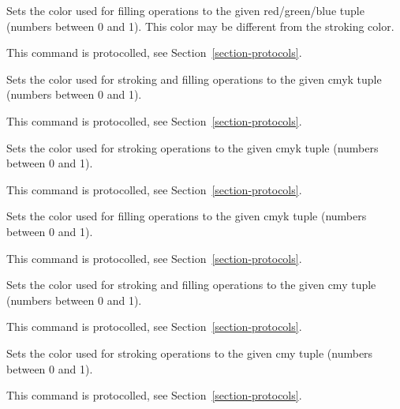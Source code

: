 \begin{command}{\pgfsys@color@rgb@fill{}}
    Sets the color used for filling operations to the given red/green/blue
    tuple (numbers between 0 and 1). This color may be different from the
    stroking color.

    This command is protocolled, see Section~\ref{section-protocols}.
\end{command}

\begin{command}{\pgfsys@color@cmyk{}}
    Sets the color used for stroking and filling operations to the given cmyk
    tuple (numbers between 0 and 1).

    This command is protocolled, see Section~\ref{section-protocols}.
\end{command}

\begin{command}{\pgfsys@color@cmyk@stroke{}}
    Sets the color used for stroking operations to the given cmyk tuple
    (numbers between 0 and 1).

    This command is protocolled, see Section~\ref{section-protocols}.
\end{command}

\begin{command}{\pgfsys@color@cmyk@fill{}}
    Sets the color used for filling operations to the given cmyk tuple (numbers
    between 0 and 1).

    This command is protocolled, see Section~\ref{section-protocols}.
\end{command}

\begin{command}{\pgfsys@color@cmy{}}
    Sets the color used for stroking and filling operations to the given cmy
    tuple (numbers between 0 and 1).

    This command is protocolled, see Section~\ref{section-protocols}.
\end{command}

\begin{command}{\pgfsys@color@cmy@stroke{}}
    Sets the color used for stroking operations to the given cmy tuple (numbers
    between 0 and 1).

    This command is protocolled, see Section~\ref{section-protocols}.
\end{command}


